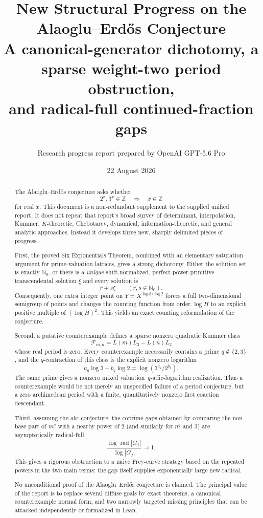 \documentclass[11pt,oneside]{article}
\title{\textbf{New Structural Progress on the Alaoglu--Erd\H{o}s Conjecture}\\[0.4em]
\large A canonical-generator dichotomy, a sparse weight-two period obstruction,\\
and radical-full continued-fraction gaps}
\author{Research progress report prepared by OpenAI GPT-5.6 Pro}
\date{22 August 2026}
\theoremstyle{definition}
\newcommand{\N}{\mathbb N}
\newcommand{\Z}{\mathbb Z}
\newcommand{\rad}{\operatorname{rad}}
\begin{document}
\maketitle

\begin{abstract}
The Alaoglu--Erd\H{o}s conjecture asks whether
\[
  2^x,3^x\in\Z \quad\Longrightarrow\quad x\in\Z
\]
for real $x$.  This document is a non-redundant supplement to the supplied unified report.  It does not repeat that report's broad survey of determinant, interpolation, Kummer, $K$-theoretic, Chebotarev, dynamical, information-theoretic, and general analytic approaches.  Instead it develops three new, sharply delimited pieces of progress.

First, the proved Six Exponentials Theorem, combined with an elementary saturation argument for prime-valuation lattices, gives a strong dichotomy.  Either the solution set is exactly $\N_0$, or there is a \emph{unique} shift-normalized, perfect-power-primitive transcendental solution $\xi$ and every solution is
\[
  r+s\xi\qquad(r,s\in\N_0).
\]
Consequently, one extra integer point on $Y=X^{\log 3/\log 2}$ forces a full two-dimensional semigroup of points and changes the counting function from order $\log H$ to an explicit positive multiple of $(\log H)^2$.  This yields an exact counting reformulation of the conjecture.

Second, a putative counterexample defines a sparse nonzero quadratic Kummer class
\[
  \mathcal F_{m,n}=L(m)L_3-L(n)L_2
\]
whose real period is zero.  Every counterexample necessarily contains a prime $q\notin\{2,3\}$, and the $q$-contraction of this class is the explicit nonzero logarithm
\[
  a_q\log 3-b_q\log 2=\log\!\left(3^{a_q}/2^{b_q}\right).
\]
The same prime gives a nonzero mixed valuation--$q$-adic-logarithm realization.  Thus a counterexample would be not merely an unspecified failure of a period conjecture, but a zero archimedean period with a finite, quantitatively nonzero first coaction descendant.

Third, assuming the $abc$ conjecture, the coprime gaps obtained by comparing the non-base part of $m^q$ with a nearby power of $2$ (and similarly for $n^q$ and $3$) are asymptotically radical-full:
\[
  \frac{\log\rad |G_j|}{\log |G_j|}\longrightarrow 1.
\]
This gives a rigorous obstruction to a naive Frey-curve strategy based on the repeated powers in the two main terms: the gap itself supplies exponentially large new radical.

No unconditional proof of the Alaoglu--Erd\H{o}s conjecture is claimed.  The principal value of the report is to replace several diffuse goals by exact theorems, a canonical counterexample normal form, and two narrowly targeted missing principles that can be attacked independently or formalized in Lean.
\end{abstract}
\end{document}
